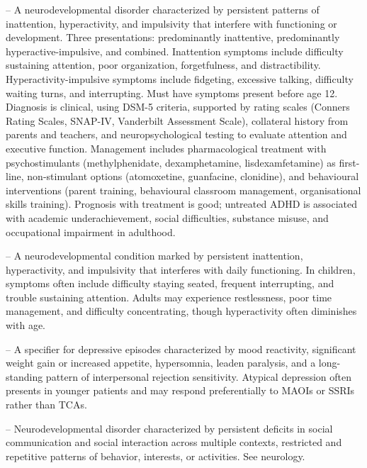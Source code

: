 -- A neurodevelopmental disorder characterized by persistent patterns of inattention, hyperactivity, and impulsivity that interfere with functioning or development. Three presentations: predominantly inattentive, predominantly hyperactive-impulsive, and combined. Inattention symptoms include difficulty sustaining attention, poor organization, forgetfulness, and distractibility. Hyperactivity-impulsive symptoms include fidgeting, excessive talking, difficulty waiting turns, and interrupting. Must have symptoms present before age 12. Diagnosis is clinical, using DSM-5 criteria, supported by rating scales (Conners Rating Scales, SNAP-IV, Vanderbilt Assessment Scale), collateral history from parents and teachers, and neuropsychological testing to evaluate attention and executive function. Management includes pharmacological treatment with psychostimulants (methylphenidate, dexamphetamine, lisdexamfetamine) as first-line, non-stimulant options (atomoxetine, guanfacine, clonidine), and behavioural interventions (parent training, behavioural classroom management, organisational skills training). Prognosis with treatment is good; untreated ADHD is associated with academic underachievement, social difficulties, substance misuse, and occupational impairment in adulthood.

-- A neurodevelopmental condition marked by persistent inattention, hyperactivity, and impulsivity that interferes with daily functioning. In children, symptoms often include difficulty staying seated, frequent interrupting, and trouble sustaining attention. Adults may experience restlessness, poor time management, and difficulty concentrating, though hyperactivity often diminishes with age.

-- A specifier for depressive episodes characterized by mood reactivity, significant weight gain or increased appetite, hypersomnia, leaden paralysis, and a long-standing pattern of interpersonal rejection sensitivity. Atypical depression often presents in younger patients and may respond preferentially to MAOIs or SSRIs rather than TCAs.

-- Neurodevelopmental disorder characterized by persistent deficits in social communication and social interaction across multiple contexts, restricted and repetitive patterns of behavior, interests, or activities. See neurology.

